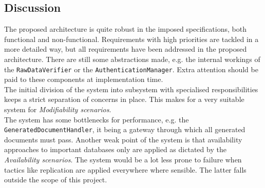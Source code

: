 \subsection{Discussion}
The proposed architecture is quite robust in the imposed specifications, both functional and non-functional. Requirements with high priorities are tackled in a more detailed way, but all requirements have been addressed in the proposed architecture. There are still some abstractions made, e.g. the internal workings of the \texttt{RawDataVerifier} or the \texttt{AuthenticationManager}. Extra attention should be paid to these components at implementation time.\\
The initial division of the system into subsystem with specialised responsibilities keeps a strict separation of concerns in place. This makes for a very suitable system for \emph{Modifiability scenarios}.\\
The system has some bottlenecks for performance, e.g. the \texttt{GeneratedDocumentHandler}, it being a gateway through which all generated documents must pass. Another weak point of the system is that availability approaches to important databases only are applied as dictated by the \emph{Availability scenarios}. The system would be a lot less prone to failure when tactics like replication are applied everywhere where sensible. The latter falls outside the scope of this project.